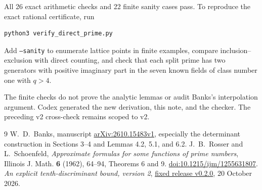 \documentclass[11pt]{article}
\begin{document}
All 26 exact arithmetic checks and 22 finite sanity cases pass.
To reproduce the exact rational certificate, run
\begin{verbatim}
python3 verify_direct_prime.py
\end{verbatim}
Add \texttt{--sanity} to enumerate lattice points in finite examples,
compare inclusion--exclusion with direct counting, and check that each
split prime has two generators with positive imaginary part in the
seven known fields of class number one with \(q>4\).

The finite checks do not prove the analytic lemmas or audit Banks's
interpolation argument. Codex generated the new derivation, this note,
and the checker. The preceding v2 cross-check remains scoped to v2.

\begin{thebibliography}{9}
W.~D.~Banks, manuscript \href{https://arxiv.org/abs/2610.15483v1}
{arXiv:2610.15483v1}, especially the determinant construction in
Sections 3--4 and Lemmas 4.2, 5.1, and 6.2.
J.~B.~Rosser and L.~Schoenfeld,
\emph{Approximate formulas for some functions of prime numbers},
Illinois J. Math. \textbf{6} (1962), 64--94, Theorems 6 and 9.
\href{https://doi.org/10.1215/ijm/1255631807}{doi:10.1215/ijm/1255631807}.
\emph{An explicit tenth-discriminant bound, version 2},
\href{https://github.com/twinheterodox/tenth-discriminant/releases/tag/v0.2.0}
{fixed release v0.2.0}, 20 October 2026.
\end{thebibliography}
\end{document}
